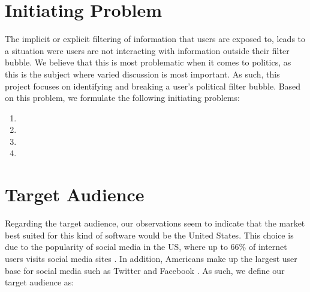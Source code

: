 \section{Initiating Problem}\label{sec:initproblem}
The implicit or explicit filtering of information that users are exposed to,
leads to a situation were users are not interacting with information outside
their filter bubble. We believe that this is most problematic when it comes to
politics, as this is the subject where varied discussion is most important. As
such, this project focuses on identifying and breaking a user's political
filter bubble. Based on this problem, we formulate the following initiating
problems:

\begin{center}
\begin{minipage}{0.95\linewidth}

\begin{enumerate}
  \item {}
  
  \item {}
  
  \item {}
  
  \item {}
  
\end{enumerate}
\end{minipage}
\end{center}

\section{Target Audience}\label{sec:target}
Regarding the target audience, our observations seem to indicate that the market
best suited for this kind of software would be the United States. This choice is
due to the popularity of social media in the US, where up to 66\% of internet
users visits social media sites \citep{socialMediaActivity}.
In addition, Americans make up the largest user base for social media such as
Twitter and Facebook \citep{socialMediaUsersTwitter, socialMediaUsersFacebook}.
As such, we define our target audience as: 

